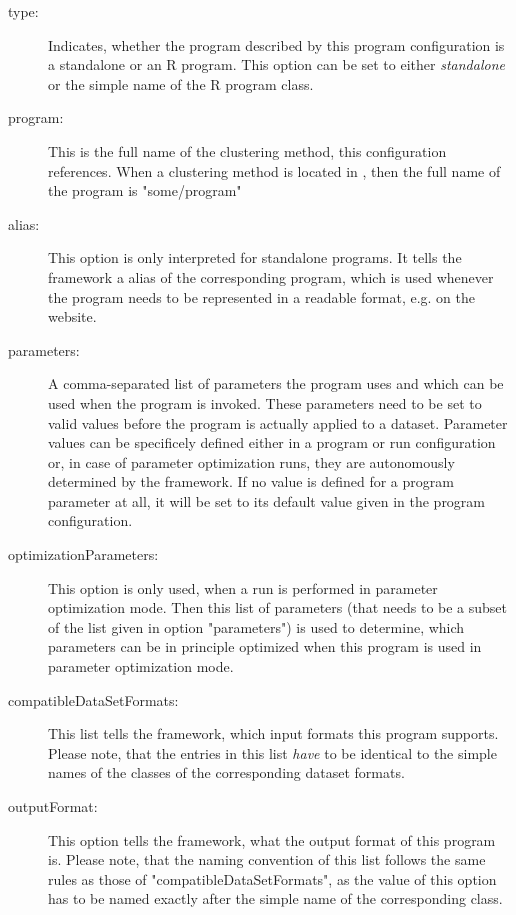 	\begin{description}
		\item[type:] Indicates, whether the program described by this program configuration is a standalone or an R program. This option can be set to either \textit{standalone} or the simple name of the R program class.

		\item[program:] This is the full name of the clustering method, this configuration references. When a clustering method is located in , then the full name of the program is "some/program"
		
		\item[alias:] This option is only interpreted for standalone programs. It tells the framework a alias of the corresponding program, which is used whenever the program needs to be represented in a readable format, e.g. on the website.
		
		\item[parameters:] 	A comma-separated list of parameters the program uses and which can be used when the program is invoked. These parameters need to be set to valid values before the program is actually applied to a dataset. Parameter values can be specificely defined either in a program or run configuration or, in case of parameter optimization runs, they are autonomously determined by the framework. If no value is defined for a program parameter at all, it will be set to its default value given in the program configuration.
		
		\item[optimizationParameters:] This option is only used, when a run is performed in parameter optimization mode. Then this list of parameters (that needs to be a subset of the list given in option "parameters") is used to determine, which parameters can be in principle optimized when this program is used in parameter optimization mode.
		
		\item[compatibleDataSetFormats:] This list tells the framework, which input formats this program supports. Please note, that the entries in this list \textit{have} to be identical to the simple names of the classes of the corresponding dataset formats.
		
		\item[outputFormat:] This option tells the framework, what the output format of this program is. Please note, that the naming convention of this list follows the same rules as those of "compatibleDataSetFormats", as the value of this option has to be named exactly after the simple name of the corresponding class.
		

\end{description}
